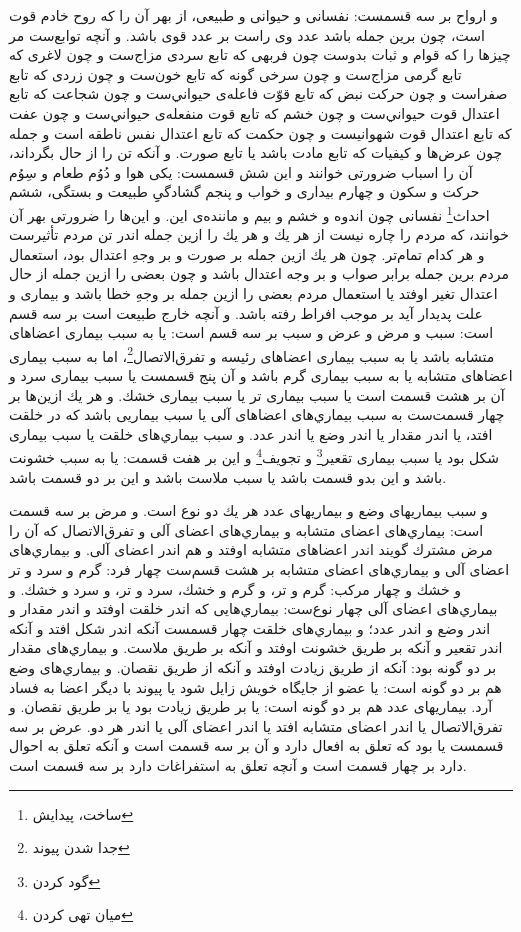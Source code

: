 و ارواح بر سه قسمست: نفسانى و حيوانى و طبيعى، از بهر آن را كه روح خادم قوت است، چون برين جمله باشد عدد وى راست بر عدد قوى باشد. و آنچه توابع‌ست مر چيزها را كه قوام و ثبات بدوست چون فربهى كه تابع سردى مزاج‌ست و چون لاغرى كه تابع گرمى مزاج‌ست و چون سرخى گونه كه تابع خون‌ست و چون زردى كه تابع صفراست و چون حركت نبض كه تابع قوّت فاعله‌ی حيواني‌ست و چون شجاعت كه تابع اعتدال قوت حيواني‌ست و چون خشم كه تابع قوت منفعله‌ی حيواني‌ست و چون عفت كه تابع اعتدال قوت شهوانيست و چون حكمت كه تابع اعتدال نفس ناطقه است و جمله چون عرض‌ها و كيفيات كه تابع مادت باشد يا تابع صورت. و آنكه تن را از حال بگرداند، آن را اسباب ضرورتى خوانند و اين شش قسمست: يكى هوا و دُوُم طعام و سِوُم حركت و سكون و چهارم بيدارى و خواب و پنجم گشادگىِِ طبيعت و بستگى، ششم احداث\footnote{ساخت، پیدایش} نفسانى چون اندوه و خشم و بيم و ماننده‌ی اين. و اين‌ها را ضرورتى بهر آن خوانند، كه مردم را چاره نيست از هر يك و هر يك را ازين جمله اندر تن مردم تأثيرست و هر كدام تمام‌تر. چون هر يك ازين جمله بر صورت و بر وجهِ اعتدال بود، استعمال مردم برين جمله برابر صواب و بر وجه اعتدال باشد و چون بعضى را ازين جمله از حال اعتدال تغير اوفتد يا استعمال مردم بعضى را ازين جمله بر وجهِ خطا باشد و بيمارى و علت پديدار آيد بر موجب افراط رفته باشد. و آنچه خارج طبيعت است بر سه قسم است: سبب و مرض و عرض و سبب بر سه قسم است: يا به سبب بيمارى اعضاهاى متشابه باشد يا به سبب بيمارى اعضاهاى رئيسه و تفرق‌الاتصال\footnote{جدا شدن پیوند}، اما به سبب بيمارى اعضاهاى متشابه يا به سبب بيمارى گرم باشد و آن پنج قسمست يا سبب بيمارى سرد و آن بر هشت قسمت است يا سبب بيمارى تر يا سبب بيمارى خشك. و هر يك ازين‌ها بر چهار قسمت‌ست به سبب بيماري‌های اعضاهاى آلى يا سبب بيماريى باشد كه در خلقت افتد، يا اندر مقدار يا اندر وضع يا اندر عدد. و سبب بيماري‌هاى خلقت يا سبب بيمارى شكل بود يا سبب بيمارى تقعير\footnote{گود کردن} و تجويف\footnote{میان تهی کردن} و اين بر هفت قسمت: يا به سبب خشونت باشد و اين بدو قسمت باشد يا سبب ملاست باشد و اين بر دو قسمت باشد.

و سبب بيماريهاى وضع و بيماريهاى عدد هر يك دو نوع است. و مرض بر سه قسمت است: بيماري‌هاى اعضاى متشابه و بيماري‌هاى اعضاى آلى و تفرق‌الاتصال كه آن را مرض مشترك گويند اندر اعضاهاى متشابه اوفتد و هم اندر اعضاى آلى. و بيماري‌هاى اعضاى آلى و بيماري‌هاى اعضاى متشابه بر هشت قسم‌ست چهار فرد: گرم و سرد و تر و خشك و چهار مركب: گرم و تر، و گرم و خشك، سرد و تر، و سرد و خشك. و بيماري‌هاى اعضاى آلى چهار نوع‌ست: بيماري‌هايى كه اندر خلقت اوفتد و اندر مقدار و اندر وضع و اندر عدد؛ و بيماري‌هاى خلقت چهار قسمست آنكه اندر شكل افتد و آنكه اندر تقعير و آنكه بر طريق خشونت اوفتد و آنكه بر طريق ملاست. و بيماري‌هاى مقدار بر دو گونه بود: آنكه از طريق زيادت اوفتد و آنكه از طريق نقصان. و بيماري‌هاى وضع هم بر دو گونه است: يا عضو از جايگاه خويش زايل شود يا پيوند با ديگر اعضا به فساد آرد. بيماريهاى عدد هم بر دو گونه است: يا بر طريق زيادت بود يا بر طريق نقصان. و تفرق‌الاتصال يا اندر اعضاى متشابه افتد يا اندر اعضاى آلى يا اندر هر دو. عرض بر سه قسمست يا بود كه تعلق به افعال دارد و آن بر سه قسمت است و آنكه تعلق به احوال دارد بر چهار قسمت است و آنچه تعلق به استفراغات دارد بر سه قسمت است.

